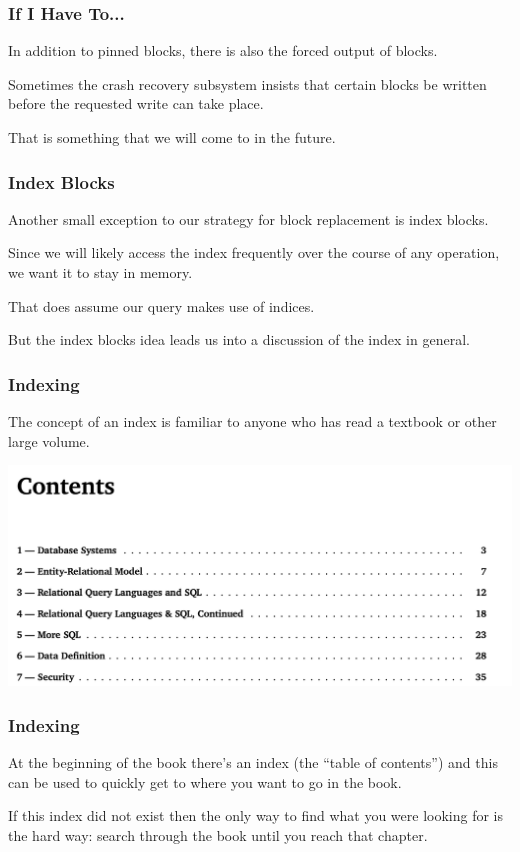 \begin{frame}
\frametitle{If I Have To...}

In addition to pinned blocks, there is also the forced output of blocks. 

Sometimes the crash recovery subsystem insists that certain blocks be written before the requested write can take place.

That is something that we will come to in the future. 

\end{frame}

\begin{frame}
\frametitle{Index Blocks}

Another small exception to our strategy for block replacement is index blocks. 

Since we will likely access the index frequently over the course of any operation, we want it to stay in memory. 

That does assume our query makes use of indices.

But the index blocks idea leads us into a discussion of the index in general.

\end{frame}

\begin{frame}
\frametitle{Indexing}

The concept of an index is familiar to anyone who has read a textbook or other large volume. 

\begin{center}
	\includegraphics[width=\textwidth]{images/toc.png}
\end{center}


\end{frame}

\begin{frame}
\frametitle{Indexing}

At the beginning of the book there's an index (the ``table of contents'') and this can be used to quickly get to where you want to go in the book. 

 If this index did not exist then the only way to find what you were looking for is the hard way: search through the book until you reach that chapter.

\end{frame}



